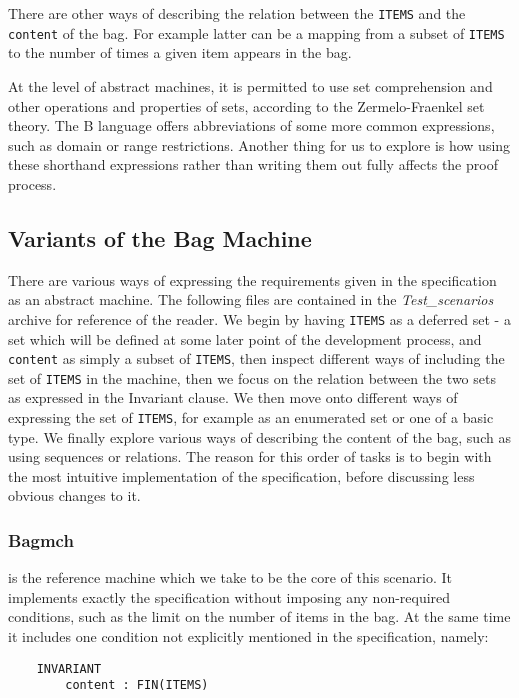 \documentclass[11pt,journal]{IEEEtran}
\begin{document}
	There are other ways of describing the relation between the \texttt{ITEMS} and the \texttt{content} of the bag. For example latter can be a mapping from a subset of \texttt{ITEMS} to the number of times a given item appears in the bag.
	
	At the level of abstract machines, it is permitted to use set comprehension and other operations and properties of sets, according to the Zermelo-Fraenkel set theory. The B language offers abbreviations of some more common expressions, such as domain or range restrictions. Another thing for us to explore is how using these shorthand expressions rather than writing them out fully affects the proof process.

	\subsection{Variants of the Bag Machine}
	There are various ways of expressing the requirements given in the specification as an abstract machine. The following files are contained in the \emph{Test\_scenarios} archive for reference of the reader. We begin by having \texttt{ITEMS} as a deferred set - a set which will be defined at some later point of the development process, and \texttt{content} as simply a subset of \texttt{ITEMS}, then inspect different ways of including the set of \texttt{ITEMS} in the machine, then we focus on the relation between the two sets as expressed in the Invariant clause. We then move onto different ways of expressing the set of \texttt{ITEMS}, for example as an enumerated set or one of a basic type. We finally explore various ways of describing the content of the bag, such as using sequences or relations. The reason for this order of tasks is to begin with the most intuitive implementation of the specification, before discussing less obvious changes to it.
	
	\subsubsection{Bagmch} is the reference machine which we take to be the core of this scenario. It implements exactly the specification without imposing any non-required conditions, such as the limit on the number of items in the bag. At the same time it includes one condition not explicitly mentioned in the specification, namely:
	\begin{lstlisting}
	INVARIANT
		content : FIN(ITEMS)
	\end{lstlisting}
\end{document}
